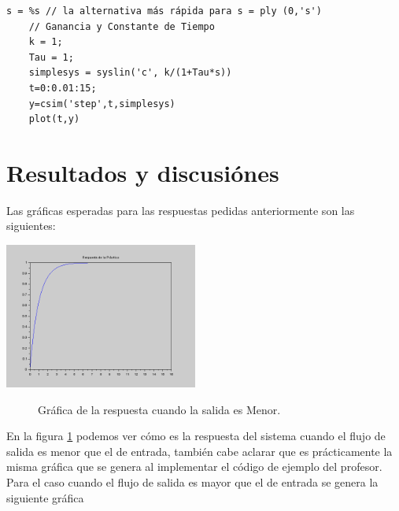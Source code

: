 \documentclass[12pt]{article}
\begin{document}
\begin{lstlisting}[frame=single]    % super cooles Programm
	s = %s // la alternativa más rápida para s = ply (0,'s')
	// Ganancia y Constante de Tiempo
	k = 1;
	Tau = 1;
	simplesys = syslin('c', k/(1+Tau*s))
	t=0:0.01:15;
	y=csim('step',t,simplesys)
	plot(t,y)
\end{lstlisting}

\section{Resultados y discusiónes}

Las gráficas esperadas para las respuestas pedidas anteriormente son las siguientes:

\begin{center}
    \includegraphics[width=2.5in]{SalidaMenor.png}
    \begin{figure}[!h]
	\caption{Gráfica de la respuesta cuando la salida es Menor.}\label{ref:Figura1}
	\end{figure}
\end{center}

En la figura \ref{ref:Figura1} podemos ver cómo es la respuesta del sistema cuando el flujo de salida es menor que el de entrada, también cabe aclarar que es prácticamente la misma gráfica que se genera al implementar el código de ejemplo del profesor.\\

Para el caso cuando el flujo de salida es mayor que el de entrada se genera la siguiente gráfica
\end{document}
